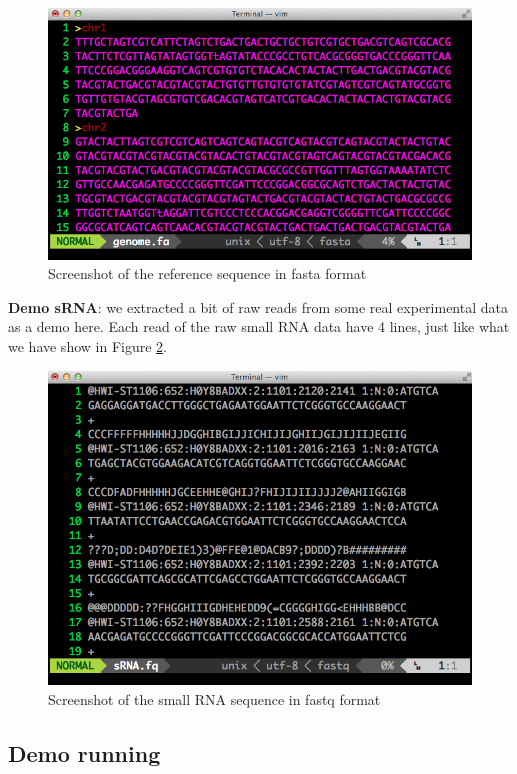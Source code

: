 \documentclass[11pt, a4paper]{article}
\begin{document}
\begin{figure}[htbp]
\begin{center}
\includegraphics[width=12cm]{refseq.png}
\caption{Screenshot of the reference sequence in fasta format} 
\label{refseq}
\end{center}
\end{figure}

\textbf{Demo sRNA}: we extracted a bit of raw reads from some real experimental data as a demo here. Each read of the raw small RNA data have 4 lines, just like what we have show in Figure \ref{fastq}.

\begin{figure}[htbp]
\begin{center}
\includegraphics[width=12cm]{fastq.png}
\caption{Screenshot of the small RNA sequence in fastq format} 
\label{fastq}
\end{center}
\end{figure}

\subsection{Demo running}
\end{document}
